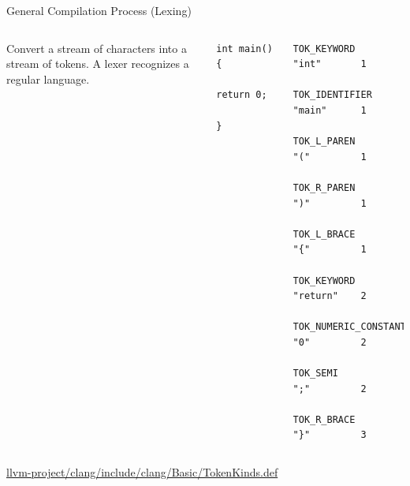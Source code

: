 \documentclass{beamer}
\begin{document}
\begin{frame}[fragile]{General Compilation Process (Lexing)}
    \begin{columns}[T,onlytextwidth]
            Convert a stream of characters into a stream of tokens. A lexer recognizes a regular language.

            \vspace{1ex}
            \begin{lstlisting}[gobble=12]
            int main() {
                return 0;
            }
            \end{lstlisting}

            \begin{lstlisting}[gobble=12]
            TOK_KEYWORD          "int"       1
            TOK_IDENTIFIER       "main"      1
            TOK_L_PAREN          "("         1
            TOK_R_PAREN          ")"         1
            TOK_L_BRACE          "{"         1
            TOK_KEYWORD          "return"    2
            TOK_NUMERIC_CONSTANT "0"         2
            TOK_SEMI             ";"         2
            TOK_R_BRACE          "}"         3
            \end{lstlisting}

    \end{columns}
    {\footnotesize \url{llvm-project/clang/include/clang/Basic/TokenKinds.def}}
\end{frame}
\end{document}

